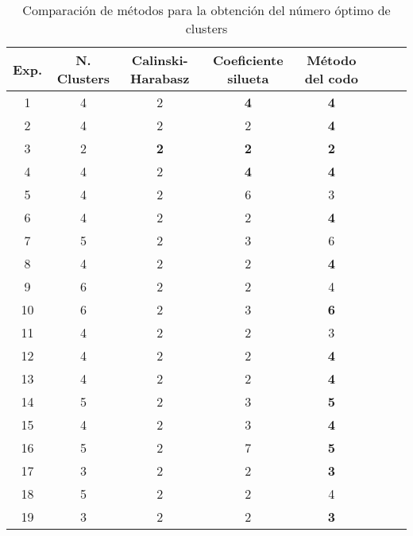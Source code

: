 \begin{table}[!htb]
    \centering
        \begin{tabular}{| c | c || c | c | c | c | c | c |}
        \hline
        Exp. & N. Clusters & Calinski-Harabasz & Coeficiente silueta & Método del codo \\ \hline 
        1 & 4 & 2 & \textbf{4} & \textbf{4} \\ \hline %
        2 & 4 & 2 & 2 & \textbf{4} \\ \hline %
        3 & 2 & \textbf{2} & \textbf{2} & \textbf{2} \\ \hline %
        4 & 4 & 2 & \textbf{4} & \textbf{4} \\ \hline %
        5 & 4 & 2 & 6 & 3 \\ \hline %
        6 & 4 & 2 & 2 & \textbf{4} \\ \hline %
        7 & 5 & 2 & 3 & 6 \\ \hline %
        8 & 4 & 2 & 2 & \textbf{4} \\ \hline %
        9 & 6 & 2 & 2 & 4 \\ \hline %
        10 & 6 & 2 & 3 & \textbf{6} \\ \hline %
        11 & 4 & 2 & 2 & 3 \\ \hline %
        12 & 4 & 2 & 2 & \textbf{4} \\ \hline %
        13 & 4 & 2 & 2 & \textbf{4} \\ \hline %
        14 & 5 & 2 & 3 & \textbf{5} \\ \hline %
        15 & 4 & 2 & 3 & \textbf{4} \\ \hline %
        16 & 5 & 2 & 7 & \textbf{5} \\ \hline %
        17 & 3 & 2 & 2 & \textbf{3} \\ \hline %
        18 & 5 & 2 & 2 & 4 \\ \hline %
        19 & 3 & 2 & 2 & \textbf{3} \\ \hline %
        \end{tabular}
    \caption{Comparación de métodos para la obtención del número óptimo de clusters}
    \label{tabla:resultados2}
\end{table}
